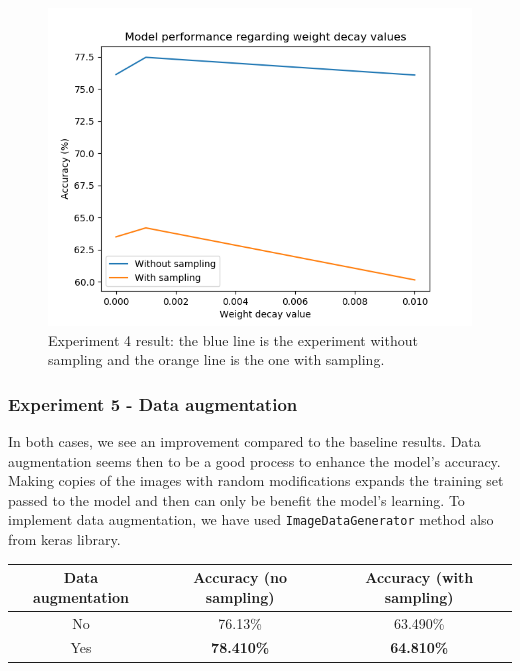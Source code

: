 \documentclass[11pt, openany]{report}
\theoremstyle{plain}
\theoremstyle{definition}
\theoremstyle{remark}
\begin{document}
\begin{figure}[H]
  \centering
  \includegraphics[scale=0.6]{Code/ch5-ModelPrototype/figures_result/weight_decay_graph.png}
  \caption{Experiment 4 result: the blue line is the experiment without sampling and the orange line is the one with sampling.}
  \label{fig:cifar_weightdecay_res}
\end{figure}


\subsubsection{Experiment 5 - Data augmentation} 

In both cases, we see an improvement compared to the baseline results. Data augmentation seems then to be a good process to enhance the model's accuracy. Making copies of the images with random modifications expands the training set passed to the model and then can only be benefit the model's learning. To implement data augmentation, we have used \texttt{ImageDataGenerator} method also from keras library.   

\begin{center}
\begin{tabular}{|c|c|c|}
  \hline
  Data augmentation & Accuracy (no sampling) & Accuracy (with sampling) \\
  \hline
  No & 76.13\% & 63.490\% \\
  Yes & \textbf{78.410\%} & \textbf{64.810\%} \\
  \hline
\end{tabular}
\end{center}
\end{document}
